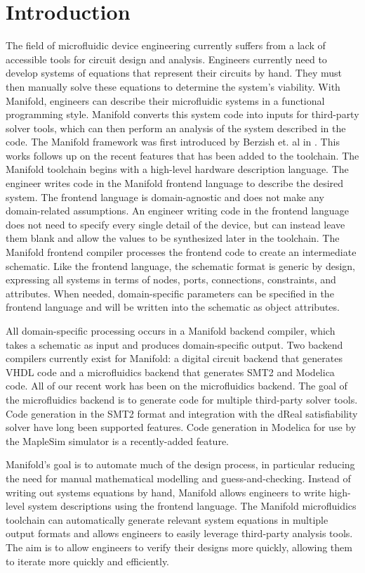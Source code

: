 \section{Introduction}

The field of microfluidic device engineering currently suffers from a lack of accessible tools for circuit design and analysis.
Engineers currently need to develop systems of equations that represent their circuits by hand.
They must then manually solve these equations to determine the system's viability.
With Manifold, engineers can describe their microfluidic systems in a functional programming style. 
Manifold converts this system code into inputs for third-party solver tools, which can then perform an analysis of the system described in the code.
The Manifold framework was first introduced by Berzish et. al in \cite{Berzish16cascon}.
This works follows up on the recent features that has been added to the toolchain.
The Manifold toolchain begins with a high-level hardware description language.
The engineer writes code in the Manifold frontend language to describe the desired system.
The frontend language is domain-agnostic and does not make any domain-related assumptions.
An engineer writing code in the frontend language does not need to specify every single detail of the device, but can instead leave them blank and allow the values to be synthesized later in the toolchain.
The Manifold frontend compiler processes the frontend code to create an intermediate schematic.
Like the frontend language, the schematic format is generic by design, expressing all systems in terms of nodes, ports, connections, constraints, and attributes.
When needed, domain-specific parameters can be specified in the frontend language and will be written into the schematic as object attributes.

All domain-specific processing occurs in a Manifold backend compiler, which takes a schematic as input and produces domain-specific output.
Two backend compilers currently exist for Manifold: a digital circuit backend that generates VHDL code and a microfluidics backend that generates SMT2 and Modelica code.
All of our recent work has been on the microfluidics backend.
The goal of the microfluidics backend is to generate code for multiple third-party solver tools.
Code generation in the SMT2 format and integration with the dReal satisfiability solver have long been supported features.
Code generation in Modelica for use by the MapleSim simulator is a recently-added feature.

Manifold's goal is to automate much of the design process, in particular reducing the need for manual mathematical modelling and guess-and-checking.
Instead of writing out systems equations by hand, Manifold allows engineers to write high-level system descriptions using the frontend language.
The Manifold microfluidics toolchain can automatically generate relevant system equations in multiple output formats and allows engineers to easily leverage third-party analysis tools.
The aim is to allow engineers to verify their designs more quickly, allowing them to iterate more quickly and efficiently.

